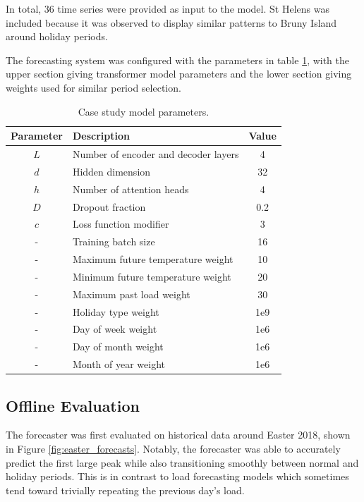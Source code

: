 In total, 36 time series were provided as input to the model.
St Helens was included because it was observed to display similar patterns to Bruny Island around holiday periods.

The forecasting system was configured with the parameters in table \ref{table:parameters}, with the upper section giving transformer model parameters and the lower section giving weights used for similar period selection.

\begin{table}[htbp]
	\caption{Case study model parameters.}
	\begin{center}
		\begin{tabular}{clc}
			\textbf{Parameter}&\textbf{Description}&\textbf{Value} \\
			\hline
			$L$ & Number of encoder and decoder layers & 4 \\
			$d$ & Hidden dimension & 32 \\
			$h$ & Number of attention heads & 4 \\
			$D$ & Dropout fraction & 0.2 \\
			$c$ & Loss function modifier & 3 \\
			-   & Training batch size & 16 \\
			\hline
			-   & Maximum future temperature weight & 10 \\
			-   & Minimum future temperature weight & 20 \\
			-   & Maximum past load weight & 30 \\
			-   & Holiday type weight & 1e9 \\
			-   & Day of week weight & 1e6 \\
			-   & Day of month weight & 1e6 \\
			-   & Month of year weight & 1e6 \\
			
		\end{tabular}
		\label{table:parameters}
	\end{center}
\end{table}

\subsection{Offline Evaluation}

The forecaster was first evaluated on historical data around Easter 2018, shown in Figure \ref{fig:easter_forecasts}.
Notably, the forecaster was able to accurately predict the first large peak while also transitioning smoothly between normal and holiday periods.
This is in contrast to load forecasting models which sometimes tend toward trivially repeating the previous day's load.


